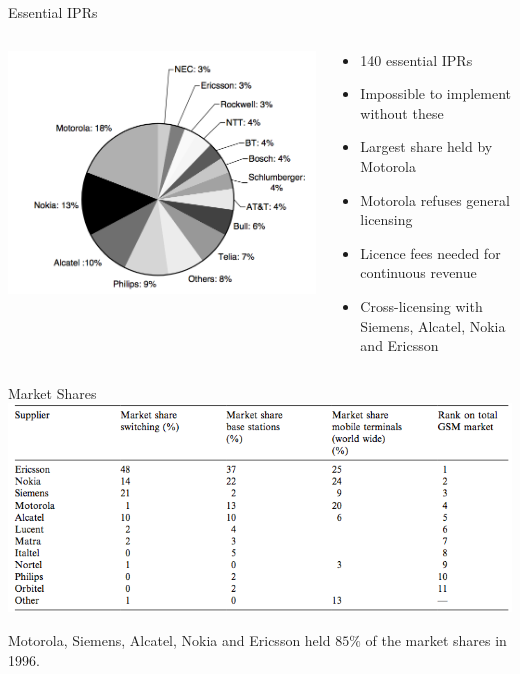 \begin{frame}{Essential IPRs}
  \begin{columns}
      \begin{column}{0.6\textwidth}
          \includegraphics[width=\textwidth]{pictures/iprs}
      \end{column}
      \hfill
    
      \begin{column}{0.4\textwidth}
          \begin{itemize}
              \item 140 essential IPRs
              \item Impossible to implement without these 
              \item Largest share held by Motorola
              \item Motorola refuses general licensing
              \item Licence fees needed for continuous revenue
              \item Cross-licensing with Siemens, Alcatel, Nokia and Ericsson
          \end{itemize}
      \end{column}
      \end{columns}
\end{frame}

\begin{frame}{Market Shares}
  \includegraphics[width=\textwidth]{pictures/2gmarketshares}
  
  Motorola, Siemens, Alcatel, Nokia and Ericsson held $85\%$ of the market shares in 1996.
\end{frame}


